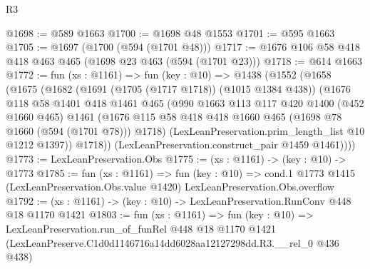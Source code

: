 \begin{lexlean}{R3}
\begin{coremodule}
@1698 := @589 @1663
@1700 := @1698 @48 @1553
@1701 := @595 @1663
@1705 := @1697 (@1700 (@594 (@1701 @48)))
@1717 := @1676 @106 @58 @418 @418 @463 @465 (@1698 @23 @463 (@594 (@1701 @23)))
@1718 := @614 @1663
@1772 := fun (xs : @1161) =>
  fun (key : @10) =>
  @1438
    (@1552
      (@1658
        (@1675
          (@1682
            (@1691 (@1705 (@1717 @1718)) (@1015 @1384 @438))
            (@1676
              @118
              @58
              @1401
              @418
              @1461
              @465
              (@990
                @1663
                @113
                @117
                @420
                @1400
                (@452 @1660 @465)
                @1461
                (@1676 @115 @58 @418 @418 @1660 @465 (@1698 @78 @1660 (@594 (@1701 @78))) @1718)
                (LexLeanPreservation.prim_length_list @10 @1212 @1397))
              @1718))
          (LexLeanPreservation.construct_pair @1459 @1461))))
@1773 := LexLeanPreservation.Obs
@1775 := (xs : @1161) -> (key : @10) -> @1773
@1785 := fun (xs : @1161) =>
  fun (key : @10) =>
  cond.{1} @1773 @1415 (LexLeanPreservation.Obs.value @1420) LexLeanPreservation.Obs.overflow
@1792 := (xs : @1161) -> (key : @10) -> LexLeanPreservation.RunConv @448 @18 @1170 @1421
@1803 := fun (xs : @1161) =>
  fun (key : @10) =>
  LexLeanPreservation.run_of_funRel
    @448
    @18
    @1170
    @1421
    (LexLeanPreserve.C1d0d1146716a14dd6028aa12127298dd.R3.__rel_0 @436 @438)
\end{coremodule}
\end{lexlean}

